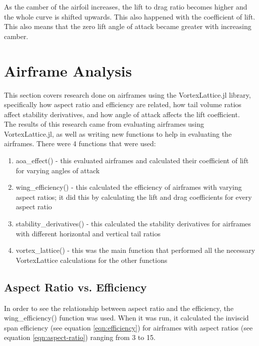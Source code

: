 \documentclass{journal}
\begin{document}
	As the camber of the airfoil increases, the lift to drag ratio becomes higher and the whole curve is shifted upwards. This also happened with the coefficient of lift. This also means that the zero lift angle of attack became greater with increasing camber.\\
	
	\section{Airframe Analysis}
	
	This section covers research done on airframes using the VortexLattice.jl library, specifically how aspect ratio and efficiency are related, how tail volume ratios affect stability derivatives, and how angle of attack affects the lift coefficient.\\
	
	The results of this research came from evaluating airframes using VortexLattice.jl, as well as writing new functions to help in evaluating the airframes. There were 4 functions that were  used:
	
	\begin{enumerate}
		\item aoa\_effect() - this evaluated airframes and calculated their coefficient of lift for varying angles of attack 
		\item wing\_efficiency() - this calculated the efficiency of airframes with varying aspect ratios; it did this by calculating the lift and drag coefficients for every aspect ratio
		\item stability\_derivatives() - this calculated the stability derivatives for airframes with different horizontal and vertical tail ratios
		\item vortex\_lattice() - this was the main function that performed all the necessary VortexLattice calculations for the other functions 
	\end{enumerate}
	
	\subsection{Aspect Ratio vs. Efficiency}
	
	In order to see the relationship between aspect ratio and the efficiency, the wing\_efficiency() function was used. When it was run, it calculated the inviscid span efficiency (see equation \ref{eqn:efficiency}) for airframes with aspect ratios (see equation \ref{eqn:aspect-ratio}) ranging from 3 to 15.\\
	
\end{document}
